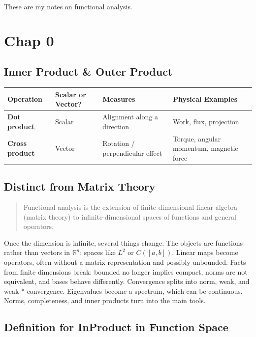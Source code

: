 These are my notes on functional analysis.

\section{Chap 0}

\subsection{Inner Product \& Outer Product}

\begin{center}
\begin{tabular}{llll}
\toprule
Operation & Scalar or Vector? & Measures & Physical Examples \\
\midrule
\textbf{Dot product} & Scalar & Alignment along a direction & Work, flux, projection \\
\textbf{Cross product} & Vector & Rotation / perpendicular effect & Torque, angular momentum, magnetic force \\
\bottomrule
\end{tabular}
\end{center}

\subsection{Distinct from Matrix Theory}

\begin{quote}
Functional analysis is the extension of finite-dimensional linear algebra (matrix theory) to infinite-dimensional spaces of functions and general operators.
\end{quote}

Once the dimension is infinite, several things change. The objects are functions rather than vectors in \(\mathbb{R}^n\): spaces like \(L^2\) or \(C([a,b])\). Linear maps become operators, often without a matrix representation and possibly unbounded. Facts from finite dimensions break: bounded no longer implies compact, norms are not equivalent, and bases behave differently. Convergence splits into norm, weak, and weak-* convergence. Eigenvalues become a spectrum, which can be continuous. Norms, completeness, and inner products turn into the main tools.

\subsection{Definition for InProduct in Function Space}


